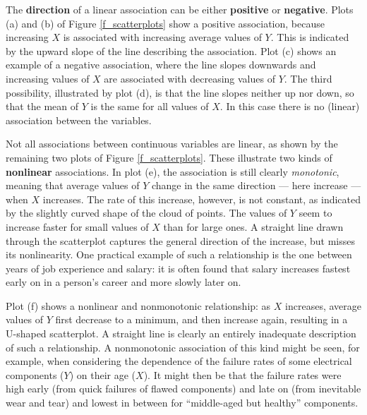 The \textbf{direction} of a linear association can be either
\textbf{positive} or \textbf{negative}. Plots (a) and (b) of Figure
\ref{f_scatterplots} show a positive association, because increasing $X$
is associated with increasing average values of $Y$. This is indicated
by the upward slope of the line describing the association. Plot (c)
shows an example of a negative association, where the line slopes
downwards and increasing values of $X$ are associated with decreasing
values of $Y$. The third possibility, illustrated by plot (d), is that
the line slopes neither up nor down, so that the mean of $Y$ is the same
for all values of $X$. In this case there is no (linear) association
between the variables.

Not all associations between continuous variables are linear, as shown
by the remaining two plots of Figure \ref{f_scatterplots}. These
illustrate two kinds of \textbf{nonlinear} associations. In plot (e),
the association is still clearly \emph{monotonic}, meaning that average
values of $Y$ change in the same direction --- here increase --- when
$X$ increases. The rate of this increase, however, is not constant, as
indicated by the slightly curved shape of the cloud of points. The
values of $Y$ seem to increase faster for small values of $X$ than for
large ones. A straight line drawn through the scatterplot captures the
general direction of the increase, but misses its nonlinearity. One
practical example of such a relationship is the one between years of
job experience and salary: it is often found that salary increases
fastest early on in a person's career and more slowly later on.

Plot (f) shows a nonlinear and nonmonotonic relationship: as $X$
increases, average values of $Y$ first decrease to a minimum, and then
increase again, resulting in a U-shaped scatterplot. A straight line is
clearly an entirely inadequate description of such a relationship. A
nonmonotonic association of this kind might be seen, for example, when
considering the dependence of the failure rates of some electrical
components ($Y$) on their age ($X$). It might then be that the failure
rates were high early (from quick failures of flawed components) and
late on (from inevitable wear and tear) and lowest in between for
``middle-aged but healthy'' components.

